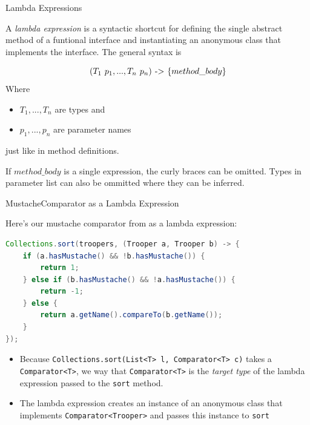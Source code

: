 \documentclass{beamer}
\begin{document}
\begin{frame}[fragile]{Lambda Expressions}

A {\it lambda expression} is a syntactic shortcut for defining the single abstract method of a funtional interface and instantiating an anonymous class that implements the interface.  The general syntax is

\[
(T_1 \hspace{.05in} p_1, ..., T_n \hspace{.05in} p_n) \hspace{.05in} \text{->} \hspace{.05in} \{ method\_body \}
\]
Where
\begin{itemize}
\item $T_1, ..., T_n$ are types and
\item $p_1, ..., p_n$ are parameter names
\end{itemize}
just like in method definitions.\\

\vspace{.05in}

If $method\_body$ is a single expression, the curly braces can be omitted.  Types in parameter list can also be ommitted where they can be inferred.


\end{frame}

\begin{frame}[fragile]{MustacheComparator as a Lambda Expression}

Here's our mustache comparator from   as a lambda expression:

\begin{lstlisting}[language=Java]
Collections.sort(troopers, (Trooper a, Trooper b) -> {
    if (a.hasMustache() && !b.hasMustache()) {
        return 1;
    } else if (b.hasMustache() && !a.hasMustache()) {
        return -1;
    } else {
        return a.getName().compareTo(b.getName());
    }
});
\end{lstlisting}

\begin{itemize}
\item Because {\tt Collections.sort(List<T> l, Comparator<T> c)} takes a {\tt Comparator<T>}, we way that {\tt Comparator<T>} is the {\it target type} of the lambda expression passed to the {\tt sort} method.
\item The lambda expression creates an instance of an anonymous class that implements {\tt Comparator<Trooper>} and passes this instance to {\tt sort}
\end{itemize}

\end{frame}
\end{document}

